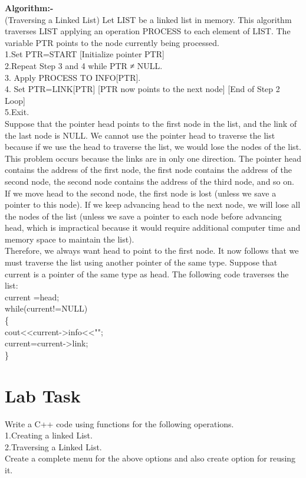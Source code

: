 \documentclass[11pt]{article}            %
\begin{document}
\textbf{Algorithm:- }\\
(Traversing a Linked List) Let LIST be a linked list in memory. This algorithm traverses
LIST applying an operation PROCESS to each element of LIST. The variable PTR points
to the node currently being processed.\\
1.Set PTR=START [Initialize pointer PTR]\\
2.Repeat Step 3 and 4 while PTR ≠ NULL.\\
3. Apply PROCESS TO INFO[PTR].\\
4. Set PTR=LINK[PTR] [PTR now points to the next node] [End
of Step 2 Loop]\\
5.Exit.\\
Suppose that the pointer head points to the first node in the list, and the link of the last node is
NULL. We cannot use the pointer head to traverse the list because if we use the head to traverse
the list, we would lose the nodes of the list. This problem occurs because the links are in
only one direction. The pointer head contains the address of the first node, the first node
contains the address of the second node, the second node contains the address of the third node,
and so on. If we move head to the second node, the first node is lost (unless we save a pointer
to this node). If we keep advancing head to the next node, we will lose all the nodes of the list
(unless we save a pointer to each node before advancing head, which is impractical because it
would require additional computer time and memory space to maintain the list).\\
Therefore, we always want head to point to the first node. It now follows that we must traverse
the list using another pointer of the same type. Suppose that current is a pointer of the same
type as head. The following code traverses the list:\\
current =head;\\
while(current!=NULL)\\
\{\\
cout<<current->info<<"";\\
current=current->link;\\
\}

\section{Lab Task }  
Write a C++ code using functions for the following operations.\\
1.Creating a linked List.\\
2.Traversing a Linked List.\\
Create a complete menu for the above options and also create option for reusing
it.\\
\end{document}
